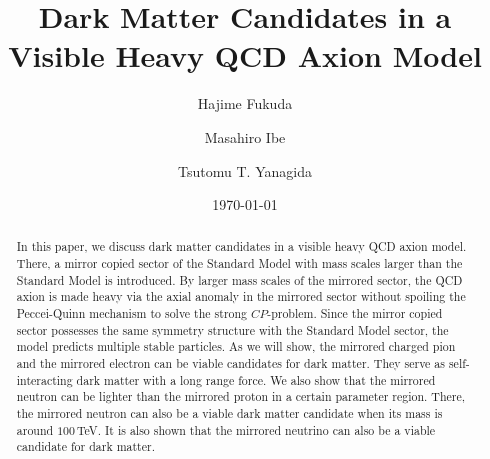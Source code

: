 \documentclass[aps,amsmath,preprint,epsf,superscriptaddress,nofootinbib,notitlepage]{revtex4-1}
\begin{document}
        






\title{Dark Matter Candidates in a Visible Heavy QCD Axion Model}
\author{Hajime Fukuda}

\author{Masahiro Ibe}

\author{Tsutomu T. Yanagida}

\date{\today}
\begin{abstract}
In this paper, we discuss dark matter candidates in a visible heavy QCD axion model. 
There, a mirror copied sector of the Standard Model
with mass scales larger than the Standard Model is introduced.
By larger mass scales of the mirrored sector, the QCD axion is made heavy 
via the axial anomaly in the mirrored sector without spoiling the Peccei-Quinn mechanism to solve the strong $CP$-problem.
Since the mirror copied sector possesses the same symmetry structure with the Standard Model sector,
the model predicts multiple stable particles.
As we will show, the mirrored charged pion and the mirrored electron 
can be  viable candidates for dark matter.
They serve as self-interacting dark matter with a long range force.
We also show that the mirrored neutron can be lighter than the mirrored proton in a certain parameter region.
There, the mirrored neutron can also be a viable dark matter candidate when its mass is around $100$\,TeV.
It is also shown that the mirrored neutrino can also be a viable candidate for dark matter.
\end{abstract}
\maketitle


\newpage


\end{document}
